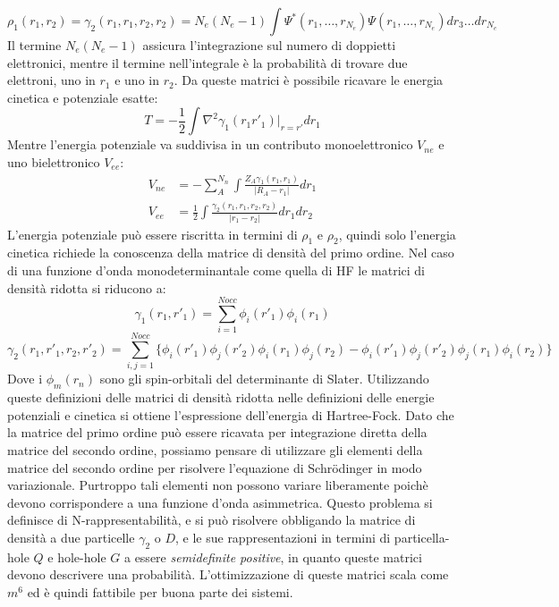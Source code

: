 \documentclass[oneside]{amsbook}
\numberwithin{section}{chapter}
\numberwithin{equation}{section}
\numberwithin{figure}{section}
\begin{document}
\begin{equation}
\rho_1(r_1, r_2) = \gamma_2(r_1,r_1,r_2,r_2)= N_e(N_e-1) \int \Psi^*( r_1, \ldots, r_{N_e})\Psi( r_1, \ldots, r_{N_e})  dr_3 \ldots dr_{N_e}
\end{equation}
Il termine $N_e(N_e-1)$ assicura l'integrazione sul numero di doppietti elettronici, mentre il termine nell'integrale è la probabilità di trovare due elettroni, uno in $r_1$ e uno in $r_2$.
Da queste matrici è possibile ricavare le energia cinetica e potenziale esatte:
\begin{equation}
T=-\frac{1}{2} \int \nabla^2 \gamma_1(r_1r'_1) \vert_{r=r'}dr_1
\end{equation}
Mentre l'energia potenziale va suddivisa in un contributo monoelettronico $V_{ne}$ e uno bielettronico $V_{ee}$:
\begin{equation}
\begin{aligned}
V_{ne} &=- \sum \limits_A ^{N_n} \int \frac{Z_A \gamma_1(r_1,r_1)}{\vert R_A-r_1\vert} d r_1\\
V_{ee} &=  \frac{1}{2} \int \frac{\gamma_2(r_1,r_1,r_2,r_2)}{\vert r_1 -r_2\vert} dr_1 dr_2
\end{aligned}
\end{equation}
L'energia potenziale può essere riscritta in termini di $\rho_1$ e $ \rho_2$, quindi solo l'energia cinetica richiede la conoscenza della matrice di densità del primo ordine.
Nel caso di una funzione d'onda monodeterminantale come quella di HF le matrici di densità ridotta si riducono a:
\begin{equation}
\gamma_1(r_1,r'_1) = \sum \limits_{i=1} ^{Nocc} \phi_i(r'_1)\phi_i(r_1)
\end{equation}
\begin{equation}
\gamma_2(r_1,r'_1,r_2,r'_2)=\sum \limits_{i,j=1} ^{Nocc} \{\phi_i(r'_1)\phi_j(r'_2)\phi_i(r_1)\phi_j(r_2)-\phi_i(r'_1)\phi_j(r'_2)\phi_j(r_1)\phi_i(r_2)\}
\end{equation}
Dove i $\phi_m(r_n)$ sono gli spin-orbitali del determinante di Slater.
Utilizzando queste definizioni delle matrici di densità ridotta nelle definizioni delle energie potenziali e cinetica si ottiene l'espressione dell'energia di Hartree-Fock.
Dato che la matrice del primo ordine può essere ricavata per integrazione diretta della matrice del secondo ordine, possiamo pensare di utilizzare gli elementi della matrice del secondo ordine per risolvere l'equazione di Schr\"odinger in modo variazionale. Purtroppo tali elementi non possono variare liberamente poichè devono corrispondere a una funzione d'onda asimmetrica. Questo problema si definisce di N-rappresentabilità, e si può risolvere obbligando la matrice di densità a due particelle $\gamma_2$ o $D$, e le sue rappresentazioni in termini di particella-hole $Q$ e hole-hole $G$ a essere \emph{semidefinite positive}, in quanto queste matrici devono descrivere una probabilità. L'ottimizzazione di queste matrici scala come $m^6$ ed è quindi fattibile per buona parte dei sistemi.
\end{document}
